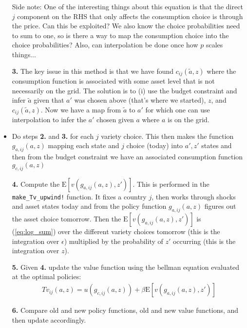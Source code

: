 \documentclass[12pt,pdftex]{article}
\begin{document}
\begin{onehalfspacing}
\begin{itemize}
Side note: One of the interesting things about this equation is that the direct $j$ component on the RHS that only affects the consumption choice is through the price. Can this be exploited? We also know the choice probabilities need to sum to one, so is there a way to map the consumption choice into the choice probabilities? Also, can interpolation be done once how $p$ scales things...

\item[\textbf{3.}] The key issue in this method is that we have found  $c_{ij}(\tilde a, z)$ where the consumption function is associated with some asset level that is not necessarily on the grid. The solution is to (i) use the budget constraint and infer $\tilde a$ given that $a'$ was chosen above (that's where we started), $z$, and $c_{ij}(\tilde a, z)$. Now we have a map from $\tilde a$ to $a'$ for which one can use interpolation to infer the $a'$ chosen given $a$ where $a$ is on the grid.

\item Do steps \textbf{2.} and \textbf{3.} for each $j$ variety choice. This then makes the function $g_{a,ij}(a,z)$ mapping each state and $j$ choice (today) into $a', z'$ states and then from the budget constraint we have an associated consumption function $g_{c,ij}(a,z)$

\item[\textbf{4.}] Compute the $\mathrm{E}\left[ v(g_{a,ij}(a,z), z') \right]$. This is performed in the {\tt{make\_Tv\_upwind!}} function. It fixes a country $j$, then works through shocks and asset states today and from the policy function $g_{a,ij}(a,z)$ figures out the asset choice tomorrow. Then the $\mathrm{E}\left[ v(g_{a,ij}(a,z), z') \right]$ is (\ref{eq:log_sum}) over the different variety choices tomorrow (this is the integration over $\epsilon$) multiplied by the probability of $z'$ occurring (this is the integration over $z$).

\item[\textbf{5.}] Given \textbf{4.} update the value function using the bellman equation evaluated at the optimal policies:
\begin{align}
Tv_{ij}(a, z) = u(g_{c,ij}(a,z)) + \beta \mathrm{E}\left[ v(g_{a,ij}(a,z), z') \right]
\end{align}

\item[\textbf{6.}] Compare old and new policy functions, old and new value functions, and then update accordingly.



\end{itemize}
\end{onehalfspacing}
\end{document}
